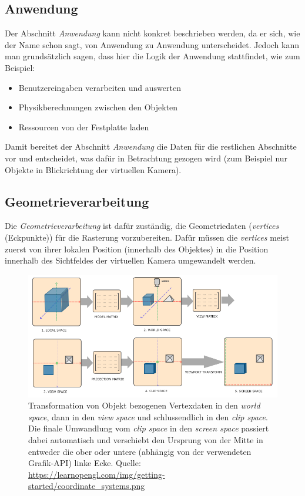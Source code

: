 \documentclass[oneside]{ausarbeitung}
\begin{document}
\subsection{Anwendung}
Der Abschnitt \textit{Anwendung} kann nicht konkret beschrieben werden, da er sich, wie der Name schon sagt, von Anwendung zu Anwendung unterscheidet. Jedoch kann man grundsätzlich sagen, dass hier die Logik der Anwendung stattfindet, wie zum Beispiel:
\begin{itemize}
\item{Benutzereingaben verarbeiten und auswerten}
\item{Physikberechnungen zwischen den Objekten}
\item{Ressourcen von der Festplatte laden}
\end{itemize}
Damit bereitet der Abschnitt \textit{Anwendung} die Daten für die restlichen Abschnitte vor und entscheidet, was dafür in Betrachtung gezogen wird (zum Beispiel nur Objekte in Blickrichtung der virtuellen Kamera).

\subsection{Geometrieverarbeitung}
\label{sub:geometry_processing}
Die \textit{Geometrieverarbeitung} ist dafür zuständig, die Geometriedaten (\textit{vertices} (Eckpunkte)) für die Rasterung vorzubereiten. Dafür müssen die \textit{vertices} meist zuerst von ihrer lokalen Position (innerhalb des Objektes) in die Position innerhalb des Sichtfeldes der virtuellen Kamera umgewandelt werden. 

\begin{figure}
    \includegraphics[width=\textwidth]{images/mvp_matrix.png}
    \caption{Transformation von Objekt bezogenen Vertexdaten in den \textit{world space}, dann in den \textit{view space} und schlussendlich in den \textit{clip space}. Die finale Umwandlung vom \textit{clip space} in den \textit{screen space} passiert dabei automatisch und verschiebt den Ursprung von der Mitte in entweder die ober oder untere (abhängig von der verwendeten Grafik-API) linke Ecke. Quelle: \url{https://learnopengl.com/img/getting-started/coordinate\_systems.png} \cite{learnopengl:coordinate_systems}}
    \label{fig:mvp_matrix}
\end{figure}
\end{document}
